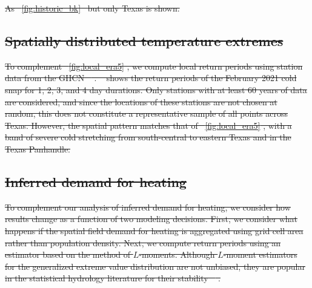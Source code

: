\documentclass[12pt]{iopart}
\providecommand{\DIFdeltex}[1]{{\protect\color{red}\sout{#1}}}                      %
\providecommand{\DIFdelFL}[1]{\DIFdel{#1}} %
\providecommand{\DIFdel}[1]{\texorpdfstring{\DIFdeltex{#1}}{}} %
\begin{document}
{%
  \DIFdelFL{As \mbox{%
      \cref{fig:historic_bk} }\hspace{0pt}%
    but only Texas is shown.
  }}%

\subsection{\DIFdel{Spatially distributed temperature extremes}}
\addtocounter{subsection}{-1}%

\DIFdel{To complement \mbox{%
    \cref{fig:local_era5}}\hspace{0pt}%
  , we compute local return periods using station data from the GHCN \mbox{%
    \cite{Menne:2012hk}}\hspace{0pt}%
  .
  \mbox{%
    \Cref{fig:local_ghcnd} }\hspace{0pt}%
  shows the return periods of the February 2021 cold snap for 1, 2, 3, and 4 day durations.
  Only stations with at least 60 years of data are considered, and since the locations of these stations are not chosen at random, this does not constitute a representative sample of all points across Texas.
  However, the spatial pattern matches that of \mbox{%
    \cref{fig:local_era5}}\hspace{0pt}%
  , with a band of severe cold stretching from south-central to eastern Texas and in the Texas Panhandle.
}%

\subsection{\DIFdel{Inferred demand for heating}}
\addtocounter{subsection}{-1}%

\DIFdel{To complement our analysis of inferred demand for heating, we consider how results change as a function of two modeling decisions.
  First, we consider what happens if the spatial field demand for heating is aggregated using grid cell area rather than population density.
  Next, we compute return periods using an estimator based on the method of $L$-moments.
  Although $L$-moment estimators for the generalized extreme value distribution are not unbiased, they are popular in the statistical hydrology literature for their stability \mbox{%
    \cite{hosking_gev:1985,martins_gev:2001,morrison_gev:2002}}\hspace{0pt}%
  .
}%
\end{document}
